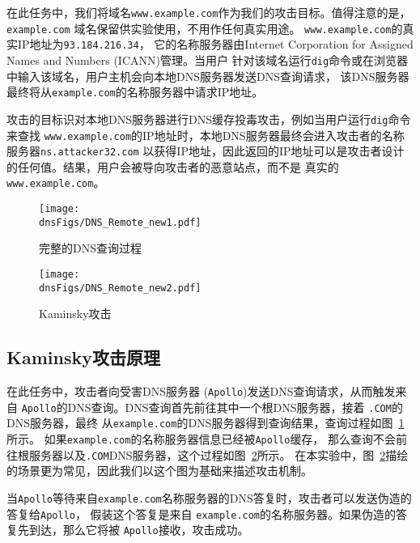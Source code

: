 在此任务中，我们将域名{\tt www.example.com}作为我们的攻击目标。值得注意的是， {\tt example.com}
域名保留供实验使用，不用作任何真实用途。 {\tt www.example.com}的真实IP地址为{\tt 93.184.216.34}，
它的名称服务器由Internet Corporation for Assigned Names and Numbers (ICANN)管理。当用户
针对该域名运行{\tt dig}命令或在浏览器中输入该域名，用户主机会向本地DNS服务器发送DNS查询请求，
该DNS服务器最终将从{\tt example.com}的名称服务器中请求IP地址。


攻击的目标识对本地DNS服务器进行DNS缓存投毒攻击，例如当用户运行{\tt dig}命令来查找
{\tt www.example.com}的IP地址时，本地DNS服务器最终会进入攻击者的名称服务器{\tt ns.attacker32.com}
以获得IP地址，因此返回的IP地址可以是攻击者设计的任何值。结果，用户会被导向攻击者的恶意站点，而不是
真实的{\tt www.example.com}。




\begin{figure}[htb]
\centering
\texttt{[image: \\dnsFigs/DNS\_Remote\_new1.pdf]}
\caption{完整的DNS查询过程} 
\label{fig:flow_diagram1}
\end{figure}


\begin{figure}[htb]
\centering
\texttt{[image: \\dnsFigs/DNS\_Remote\_new2.pdf]}
\caption{Kaminsky攻击}
\label{fig:flow_diagram2}
\end{figure}



\subsection{Kaminsky攻击原理}

在此任务中，攻击者向受害DNS服务器 ({\tt Apollo})发送DNS查询请求，从而触发来自
{\tt Apollo}的DNS查询。DNS查询首先前往其中一个根DNS服务器，接着 {\tt .COM}的DNS服务器，最终
从{\tt example.com}的DNS服务器得到查询结果，查询过程如图~\ref{fig:flow_diagram1}所示。
如果{\tt example.com}的名称服务器信息已经被{\tt Apollo}缓存，
那么查询不会前往根服务器以及{\tt .COM}DNS服务器，这个过程如图~\ref{fig:flow_diagram2}所示。
在本实验中，图~\ref{fig:flow_diagram2}描绘的场景更为常见，因此我们以这个图为基础来描述攻击机制。


当{\tt Apollo}等待来自{\tt example.com}名称服务器的DNS答复时，攻击者可以发送伪造的答复给{\tt Apollo}，
假装这个答复是来自 {\tt example.com}的名称服务器。如果伪造的答复先到达，那么它将被
{\tt Apollo}接收，攻击成功。


